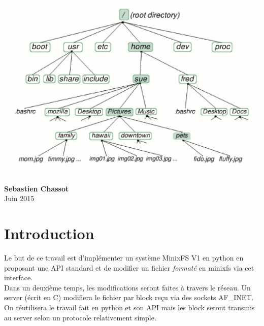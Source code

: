 \documentclass[a4paper,12pt]{article}
\begin{document}
\vspace{3cm}
\centerline{\includegraphics[scale=0.52]{imgs/illustration_FS}}
\vspace{2cm}

\begin{center}
\textbf{Sebastien Chassot} \\ Juin 2015
\end{center}

\thispagestyle{empty} %

\newpage %
\tableofcontents %
\listoffigures
\listoftables
\newpage %



\section{Introduction}

Le but de ce travail est d'implémenter un système MinixFS V1 en python en proposant une API standard et de modifier un fichier \emph{formaté} en minixfs via cet interface.\\

Dans un deuxième temps, les modifications seront faites à  travers le réseau. Un server (écrit en C) modifiera le fichier par block reçu via des sockets AF\_INET. On réutilisera le travail fait en python et son API mais les block seront transmis au server selon un protocole relativement simple.
 
\end{document}
